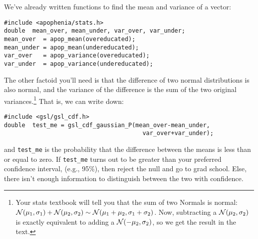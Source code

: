 We've already written functions to find the mean and variance of a vector:

\begin{verbatim}
#include <apophenia/stats.h>
double	mean_over, mean_under, var_over, var_under;
mean_over  = apop_mean(overeducated);
mean_under = apop_mean(undereducated);
var_over   = apop_variance(overeducated);
var_under  = apop_variance(undereducated);
\end{verbatim}

The other factoid you'll need is that the difference of two normal
distributions is also normal, and the variance of the difference is
the sum of the two original variances.\footnote{Your stats textbook
will tell you that the sum of two Normals is normal: ${\cal N}(\mu_1,
\sigma_1) + {\cal N}(\mu_2, \sigma_2) \sim {\cal N}(\mu_1 + \mu_2,
\sigma_1 + \sigma_2)$. Now, subtracting a ${\cal N}(\mu_2, \sigma_2)$
is exactly equivalent to adding a ${\cal N}(-\mu_2, \sigma_2)$, so we
get the result in the text.} That is, we can write down:

\begin{verbatim}
#include <gsl/gsl_cdf.h>
double	test_me = gsl_cdf_gaussian_P(mean_over-mean_under, 
                                       var_over+var_under);
\end{verbatim}

and {\tt test\_me} is the probability that the difference between the
means is less than or equal to zero. If {\tt test\_me} turns out to be greater
than your preferred confidence interval, (e.g., 95\%), then reject the
null and go to grad school. Else, there isn't enough information to
distinguish between the two with confidence.


